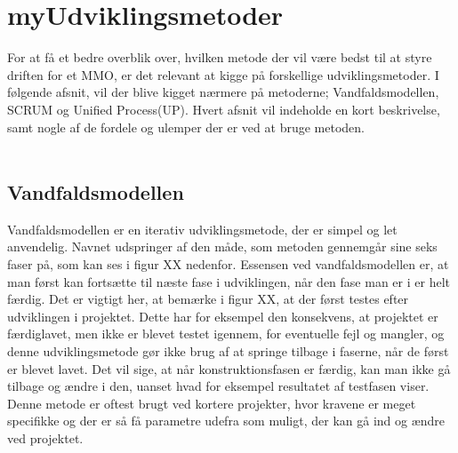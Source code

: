 \cfoot{\page\textbackslash \totalp} %
\chapter{myUdviklingsmetoder}
For at få et bedre overblik over, hvilken metode der vil være bedst til at styre driften for et MMO, er det relevant at kigge på forskellige udviklingsmetoder. I følgende afsnit, vil der blive kigget nærmere på metoderne; Vandfaldsmodellen, SCRUM og Unified Process(UP). Hvert afsnit vil indeholde en kort beskrivelse, samt nogle af de fordele og ulemper der er ved at bruge metoden.\\
\\
\section*{Vandfaldsmodellen} 
Vandfaldsmodellen er en iterativ udviklingsmetode, der er simpel og let anvendelig.\cite{Waterfall} Navnet udspringer af den måde, som metoden gennemgår sine seks faser på, som kan ses i figur XX nedenfor. Essensen ved vandfaldsmodellen er, at man først kan fortsætte til næste fase i udviklingen, når den fase man er i er helt færdig. Det er vigtigt her, at bemærke i figur XX, at der først testes efter udviklingen i projektet. Dette har for eksempel den konsekvens, at projektet er færdiglavet, men ikke er blevet testet igennem, for eventuelle fejl og mangler, og denne udviklingsmetode gør ikke brug af at springe tilbage i faserne, når de først er blevet lavet. Det vil sige, at når konstruktionsfasen er færdig, kan man ikke gå tilbage og ændre i den, uanset hvad for eksempel resultatet af testfasen viser. Denne metode er oftest brugt ved kortere projekter, hvor kravene er meget specifikke og der er så få parametre udefra som muligt, der kan gå ind og ændre ved projektet.\\
\\
\\

